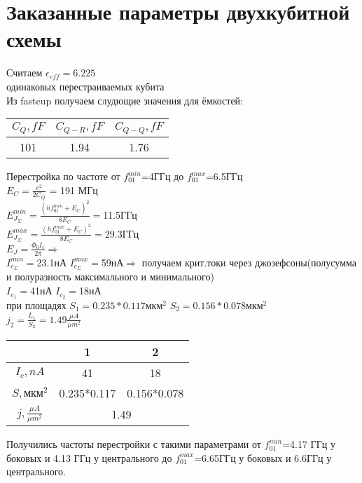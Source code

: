 \documentclass[12pt, twoside]{report}
\begin{document}
\newpage
	\section{Заказанные параметры двухкубитной схемы}
\noindent Считаем $\epsilon_{eff}=6.225$\\
 одинаковых перестраиваемых кубита\\
\noindent Из fastcup получаем слудющие значения для ёмкостей:
	\begin{center}
		\begin{tabular}{ | c | c | c | }
   		 	\hline
   			$C_Q,fF$ & $ C_{Q-R},fF$ &$ C_{Q-Q},fF$ \\ \hline
   		 	101 & 1.94 & 1.76 \\ \hline
		\end{tabular}
	\end{center}
\noindent Перестройка по частоте от $f_{01}^{min}$=4ГГц до $f_{01}^{max}$=6.5ГГц\\
$E_{C}=\frac{e^2}{2C_Q}$ = 191 МГц\\
$E_{J_{\Sigma}}^{min} = \frac{(hf_{01}^{min}+E_{C})^2}{8E_{C}}=$11.5ГГц \\
$E_{J_{\Sigma}}^{max} = \frac{(hf_{01}^{max}+E_{C})^2}{8E_{C}}=$29.3ГГц \\
$E_{J}=\frac{\Phi_0 I_c}{2\pi}\Rightarrow$ \\
$I_{c_{\Sigma}}^{min}=$23.1нА $I_{c_{\Sigma}}^{max}=$59нА$\Rightarrow$
получаем крит.токи через джозефсоны(полусумма и полуразность максимального и минимального)\\
$I_{c_{1}}=$41нА $I_{c_{2}}=$18нА\\
при площадях $S_1 = 0.235*0.117 \text{мкм}^2$  $S_2 = 0.156*0.078\text{мкм}^2$  \\
$j_2=\frac{I_{c_{2}}}{S_2}=1.49\frac{\mu A}{{\mu m}^2}$
	\begin{center}
		\begin{tabular}{ | c | c | c |}
   		 	\hline
   			  &1 &2 \\ \hline
    			 $I_c,nA$ & 41 & 18 \\ \hline
    	 		$S,{\text{мкм}}^2$ & 0.235*0.117 & 0.156*0.078  \\ \hline
    	 		 $j,\frac{\mu A}{{\mu m}^2}$  &\multicolumn{2}{|c|}{1.49}\\ \hline
		\end{tabular}
	\end{center}
	
Получились частоты перестройки с такими параметрами 
от $f_{01}^{min}$=4.17 ГГц у боковых и 4.13 ГГц у центрального до $f_{01}^{max}$=6.65ГГц у боковых и 6.6ГГц у центрального.
\end{document}

